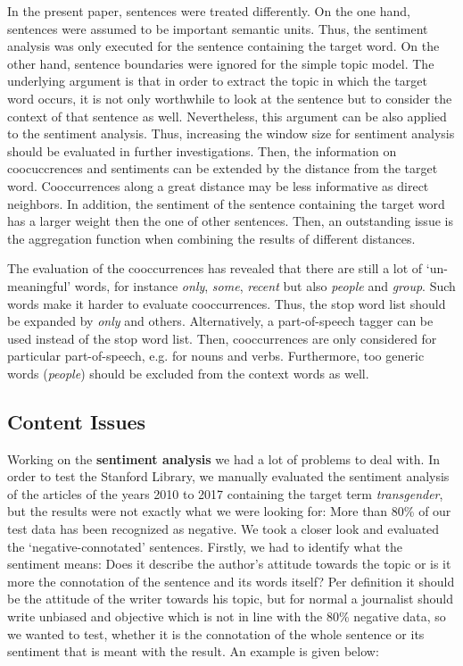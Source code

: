 \documentclass[10pt,a4paper,twocolumn]{scrartcl}
\begin{document}
In the present paper, sentences were treated differently. On the one hand, sentences were assumed to be important semantic units. Thus, the sentiment analysis was only executed for the sentence containing the target word. On the other hand, sentence boundaries were ignored for the simple topic model. The underlying argument is that in order to extract the topic in which the target word occurs, it is not only worthwhile to look at the sentence but to consider the context of that sentence as well. Nevertheless, this argument can be also applied to the sentiment analysis. Thus, increasing the window size for sentiment analysis should be evaluated in further investigations. Then, the information on coocuccrences and sentiments can be extended by the distance from the target word. Cooccurrences along a great distance may be less informative as direct neighbors. In addition, the sentiment of the sentence containing the target word has a larger weight then the one of other sentences. Then, an outstanding issue is the aggregation function when combining the results of different distances.

The evaluation of the cooccurrences has revealed that there are still a lot of `un-meaningful' words, for instance \textit{only}, \textit{some}, \textit{recent} but also \textit{people} and \textit{group}. Such words make it harder to evaluate cooccurrences. Thus, the stop word list should be expanded by \textit{only} and others. Alternatively, a part-of-speech tagger can be used instead of the stop word list. Then, cooccurrences are only considered for particular part-of-speech, e.g. for nouns and verbs. Furthermore, too generic words (\textit{people}) should be excluded from the context words as well. 


\subsection{Content Issues}\label{subsex:contentIssues}
Working on the \textbf{sentiment analysis} we had a lot of problems to deal with. In order to test the Stanford Library, we manually evaluated the sentiment analysis of the articles of the years 2010 to 2017 containing the target term \textit{transgender}, but the results were not exactly what we were looking for: More than 80\% of our test data has been recognized as negative. We took a closer look and evaluated the `negative-connotated' sentences. Firstly, we had to identify what the sentiment means: Does it describe the author's attitude towards the topic or is it more the connotation of the sentence and its words itself? Per definition it should be the attitude of the writer towards his topic, but for normal a journalist should write unbiased and objective which is not in line with the 80\% negative data, so we wanted to test, whether it is the connotation of the whole sentence or its sentiment that is meant with the result. An example is given below:
\end{document}

